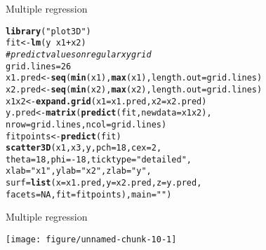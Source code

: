 \documentclass[10pt]{beamer}\usepackage[]{graphicx}\usepackage[]{color}
\makeatletter
\newcommand{\hlnum}[1]{\textcolor[rgb]{0.686,0.059,0.569}{#1}}%
\newcommand{\hlstr}[1]{\textcolor[rgb]{0.192,0.494,0.8}{#1}}%
\newcommand{\hlcom}[1]{\textcolor[rgb]{0.678,0.584,0.686}{\textit{#1}}}%
\newcommand{\hlopt}[1]{\textcolor[rgb]{0,0,0}{#1}}%
\newcommand{\hlstd}[1]{\textcolor[rgb]{0.345,0.345,0.345}{#1}}%
\newcommand{\hlkwb}[1]{\textcolor[rgb]{0.69,0.353,0.396}{#1}}%
\newcommand{\hlkwc}[1]{\textcolor[rgb]{0.333,0.667,0.333}{#1}}%
\newcommand{\hlkwd}[1]{\textcolor[rgb]{0.737,0.353,0.396}{\textbf{#1}}}%
\newenvironment{kframe}{%
 \def\at@end@of@kframe{}%
 \ifinner\ifhmode%
  \def\at@end@of@kframe{\end{minipage}}%
  \begin{minipage}{\columnwidth}%
 \fi\fi%
 \def\FrameCommand##1{\hskip\@totalleftmargin \hskip-\fboxsep
 \colorbox{shadecolor}{##1}\hskip-\fboxsep
     \hskip-\linewidth \hskip-\@totalleftmargin \hskip\columnwidth}%
 \MakeFramed {\advance\hsize-\width
   \@totalleftmargin\z@ \linewidth\hsize
   \@setminipage}}%
 {\par\unskip\endMakeFramed%
 \at@end@of@kframe}
\newenvironment{knitrout}{}{} %
\makeatother
\begin{document}
\begin{frame}[fragile]{Multiple regression}
\begin{knitrout}\small
{}\color{fgcolor}\begin{kframe}
\begin{alltt}
        \hlkwd{library}\hlstd{(}\hlstr{"plot3D"}\hlstd{)}
\hlstd{fit} \hlkwb{<-} \hlkwd{lm}\hlstd{(y} \hlopt{~} \hlstd{x1} \hlopt{+} \hlstd{x2)}
\hlcom{# predict values on regular xy grid}
\hlstd{grid.lines} \hlkwb{=} \hlnum{26}
\hlstd{x1.pred} \hlkwb{<-} \hlkwd{seq}\hlstd{(}\hlkwd{min}\hlstd{(x1),} \hlkwd{max}\hlstd{(x1),} \hlkwc{length.out} \hlstd{= grid.lines)}
\hlstd{x2.pred} \hlkwb{<-} \hlkwd{seq}\hlstd{(}\hlkwd{min}\hlstd{(x2),} \hlkwd{max}\hlstd{(x2),} \hlkwc{length.out} \hlstd{= grid.lines)}
\hlstd{x1x2} \hlkwb{<-} \hlkwd{expand.grid}\hlstd{(} \hlkwc{x1} \hlstd{= x1.pred,} \hlkwc{x2} \hlstd{= x2.pred)}
\hlstd{y.pred} \hlkwb{<-} \hlkwd{matrix}\hlstd{(}\hlkwd{predict}\hlstd{(fit,} \hlkwc{newdata} \hlstd{= x1x2),}
                 \hlkwc{nrow} \hlstd{= grid.lines,} \hlkwc{ncol} \hlstd{= grid.lines)}
\hlstd{fitpoints} \hlkwb{<-} \hlkwd{predict}\hlstd{(fit)}
\hlkwd{scatter3D}\hlstd{(x1, x3, y,} \hlkwc{pch} \hlstd{=} \hlnum{18}\hlstd{,} \hlkwc{cex} \hlstd{=} \hlnum{2}\hlstd{,}
    \hlkwc{theta} \hlstd{=}\hlnum{18}\hlstd{,} \hlkwc{phi} \hlstd{=} \hlopt{-}\hlnum{18}\hlstd{,} \hlkwc{ticktype} \hlstd{=} \hlstr{"detailed"}\hlstd{,}
    \hlkwc{xlab} \hlstd{=} \hlstr{"x1"}\hlstd{,} \hlkwc{ylab} \hlstd{=} \hlstr{"x2"}\hlstd{,} \hlkwc{zlab} \hlstd{=} \hlstr{"y"}\hlstd{,}
    \hlkwc{surf} \hlstd{=} \hlkwd{list}\hlstd{(}\hlkwc{x} \hlstd{= x1.pred,} \hlkwc{y} \hlstd{= x2.pred,} \hlkwc{z} \hlstd{= y.pred,}
    \hlkwc{facets} \hlstd{=} \hlnum{NA}\hlstd{,} \hlkwc{fit} \hlstd{= fitpoints),} \hlkwc{main} \hlstd{=} \hlstr{""}\hlstd{)}
\end{alltt}
\end{kframe}
\end{knitrout}
    \end{frame}

\begin{frame}[fragile]{Multiple regression}

\begin{knitrout}\small
{}\color{fgcolor}
\texttt{[image: figure/unnamed-chunk-10-1]} 

\end{knitrout}
    \end{frame}
\end{document}
